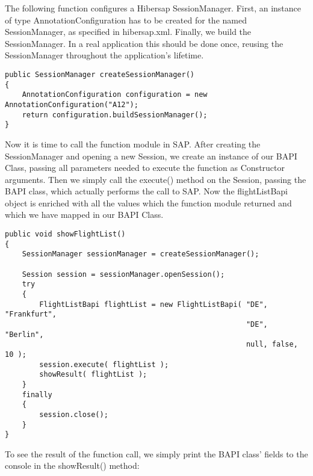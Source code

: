 The following function configures a Hibersap SessionManager. First, an instance of type AnnotationConfiguration has to be created for the named SessionManager, as specified in hibersap.xml. Finally, we build the SessionManager. In a real application this should be done once, reusing the SessionManager throughout the application's lifetime.

\begin{Verbatim}[frame=single,label=Creating the SessionManager]
public SessionManager createSessionManager()
{
    AnnotationConfiguration configuration = new AnnotationConfiguration("A12");
    return configuration.buildSessionManager();
}
\end{Verbatim}

Now it is time to call the function module in SAP.
After creating the SessionManager and opening a new Session, we create an instance of our
BAPI Class, passing all parameters needed to execute the function as Constructor arguments.
Then we simply call the execute() method on the Session, passing the BAPI class,
which actually performs the call to SAP. Now the flightListBapi object is enriched with all the
values which the function module returned and which we have mapped in our BAPI Class.

\begin{Verbatim}[frame=single,label=Executing the function]
public void showFlightList()
{
    SessionManager sessionManager = createSessionManager();

    Session session = sessionManager.openSession();
    try
    {
        FlightListBapi flightList = new FlightListBapi( "DE", "Frankfurt", 
                                                        "DE", "Berlin", 
                                                        null, false, 10 );
        session.execute( flightList );
        showResult( flightList );
    }
    finally
    {
        session.close();
    }
}
\end{Verbatim}

To see the result of the function call, we simply print the BAPI class' fields to the console in the
showResult() method:

